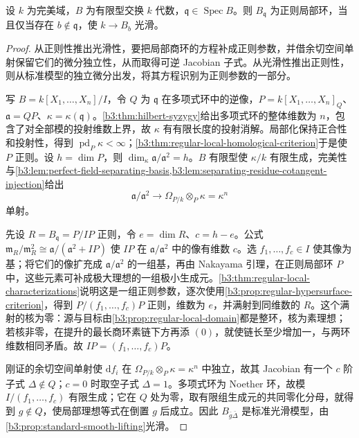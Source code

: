 \begin{theorem}[完美基域上的比较]\label{b3:thm:perfect-field-regular-smooth}
	设 \(k\) 为完美域，\(B\) 为有限型交换 \(k\) 代数，\(\mathfrak q\in\operatorname{Spec}B\)。则 \(B_{\mathfrak q}\) 为正则局部环，当且仅当存在 \(b\notin\mathfrak q\)，使 \(k\rightarrow B_b\) 光滑。
\end{theorem}
\begin{proof}
	从正则性推出光滑性，要把局部商环的方程补成正则参数，并借余切空间单射保留它们的微分独立性，从而取得可逆 Jacobian 子式。从光滑性推出正则性，则从标准模型的独立微分出发，将其方程识别为正则参数的一部分。

	写 \(B=k[X_1,\ldots,X_n]/I\)，令 \(Q\) 为 \(\mathfrak q\) 在多项式环中的逆像，\(P=k[X_1,\ldots,X_n]_Q\)、\(\mathfrak a=QP\)、\(\kappa=\kappa(\mathfrak q)\)。\cref{b3:thm:hilbert-syzygy}给出多项式环的整体维数为 \(n\)，包含了对全部模的投射维数上界，故 \(\kappa\) 有有限长度的投射消解。局部化保持正合性和投射性，得到 \(\operatorname{pd}_P\kappa<\infty\)；\cref{b3:thm:regular-local-homological-criterion}于是使 \(P\) 正则。设 \(h=\dim P\)，则 \(\dim_\kappa\mathfrak a/\mathfrak a^2=h\)。\(B\) 有限型使 \(\kappa/k\) 有限生成，完美性与\cref{b3:lem:perfect-field-separating-basis,b3:lem:separating-residue-cotangent-injection}给出
	\[
		\mathfrak a/\mathfrak a^2\longrightarrow \Omega_{P/k}\otimes_P\kappa=\kappa^n
	\]
	单射。

	先设 \(R=B_{\mathfrak q}=P/IP\) 正则，令 \(e=\dim R\)、\(c=h-e\)。公式 \(\mathfrak m_R/\mathfrak m_R^2\cong\mathfrak a/(\mathfrak a^2+IP)\) 使 \(IP\) 在 \(\mathfrak a/\mathfrak a^2\) 中的像有维数 \(c\)。选 \(f_1,\ldots,f_c\in I\) 使其像为基；将它们的像扩充成 \(\mathfrak a/\mathfrak a^2\) 的一组基，再由 Nakayama 引理，在正则局部环 \(P\) 中，这些元素可补成极大理想的一组极小生成元。\cref{b3:thm:regular-local-characterizations}说明这是一组正则参数，逐次使用\cref{b3:prop:regular-hypersurface-criterion}，得到 \(P/(f_1,\ldots,f_c)P\) 正则，维数为 \(e\)，并满射到同维数的 \(R\)。这个满射的核为零：源与目标由\cref{b3:prop:regular-local-domain}都是整环，核为素理想；若核非零，在提升的最长商环素链下方再添 \((0)\)，就使链长至少增加一，与两环维数相同矛盾。故 \(IP=(f_1,\ldots,f_c)P\)。

	刚证的余切空间单射使 \(\mathrm{d}f_i\) 在 \(\Omega_{P/k}\otimes_P\kappa=\kappa^n\) 中独立，故其 Jacobian 有一个 \(c\) 阶子式 \(\Delta\notin Q\)；\(c=0\) 时取空子式 \(\Delta=1\)。多项式环为 Noether 环，故模 \(I/(f_1,\ldots,f_c)\) 有限生成；它在 \(Q\) 处为零，取有限组生成元的共同零化分母，就得到 \(g\notin Q\)，使局部理想等式在倒置 \(g\) 后成立。因此 \(B_{\bar g\bar\Delta}\) 是标准光滑模型，由\cref{b3:prop:standard-smooth-lifting}光滑。


\end{proof}
